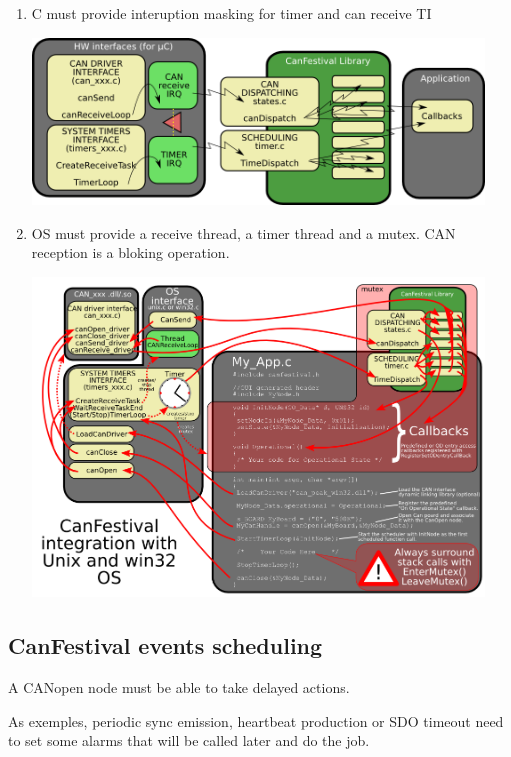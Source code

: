 \documentclass[a4paper,12pt]{book}
\newcommand\liststyleLvi{%
\renewcommand\labelitemi{{--}}
\renewcommand\labelitemii{{--}}
\renewcommand\labelitemiii{{--}}
\renewcommand\labelitemiv{{--}}
}
\newcommand{\canopen}{CANopen}
\begin{document}
\liststyleLvi
\begin{enumerate}
\item {\textmu}C must provide interuption masking for timer and can
receive TI\newline
 \begin{center}
   \includegraphics[width=12cm]{Pictures/10000201000003CA0000016604E6A5EF.png}
\end{center}
\item OS must provide a receive thread, a timer thread and a mutex. CAN
reception is a bloking operation.\newline
\begin{center}
   \includegraphics[width=12cm]{Pictures/10000201000003F9000002CF8B0CDAEA.png}
\end{center}
\end{enumerate}
\subsection{CanFestival events scheduling}
A \canopen{} node must be able to take delayed actions.

As exemples, periodic sync emission, heartbeat production or SDO timeout
need to set some alarms that will be called later and do the job.
\end{document}
